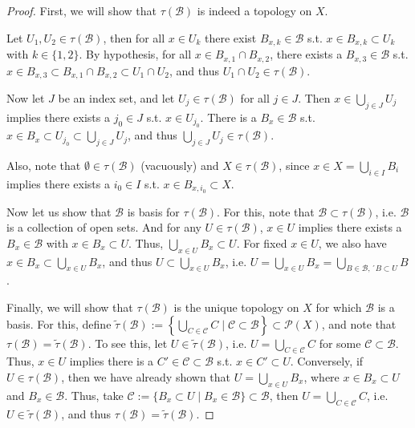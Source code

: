 \begin{proof}
	First, we will show that $\tau(\mathscr B)$ is indeed a topology on $X$. 
	
	Let $U_1, U_2\in\tau(\mathscr B)$, then for all $x\in U_k$ there exist $B_{x, k}\in\mathscr B$ s.t. $x\in B_{x, k}\subset U_k$ with $k \in\{1, 2\}$. By hypothesis, for all $x\in B_{x, 1}\cap B_{x, 2}$, there exists a $B_{x, 3}\in\mathscr B$ s.t. $x\in B_{x, 3}\subset B_{x, 1}\cap B_{x, 2}\subset U_1\cap U_2$, and thus $U_1\cap U_2\in\tau(\mathscr B)$.
	
	Now let $J$ be an index set, and let $U_j\in \tau(\mathscr B)$ for all $j\in J$. Then $x\in \bigcup_{j\in J}U_j$ implies there exists a $j_0\in J$ s.t. $x\in U_{j_0}$. There is a $B_{x}\in\mathscr B$ s.t. $x\in B_x\subset U_{j_0} \subset \bigcup_{j\in J}U_j$, and thus $\bigcup_{j\in J}U_j\in \tau(\mathscr B)$.
	
	Also, note that $\emptyset\in\tau(\mathscr B)$ (vacuously) and $X\in \tau(\mathscr B)$, since $x\in X = \bigcup_{i\in I}B_i$ implies there exists a $i_0\in I$ s.t. $x\in B_{x, i_0}\subset X$.
	
	Now let us show that $\mathscr B$ is basis for $\tau(\mathscr B)$. For this, note that $\mathscr B\subset \tau(\mathscr B)$, i.e. $\mathscr B$ is a collection of open sets. And for any $U\in\tau(\mathscr B)$, $x\in U$ implies there exists a $B_{x}\in \mathscr B$ with $x\in B_x\subset U$. Thus, $\bigcup_{x\in U}B_x \subset U$. For fixed $x\in U$, we also have $x\in B_x\subset \bigcup_{x\in U}B_x$, and thus $U\subset \bigcup_{x\in U}B_x$, i.e. $U = \bigcup_{x\in U}B_x = \bigcup_{B\in\mathscr B, ´B\subset U}B$.
	
	Finally, we will show that $\tau(\mathscr B)$ is the unique topology on $X$ for which $\mathscr B$ is a basis. For this, define $\tilde{\tau}(\mathscr B) := \left\{ \bigcup_{C\in\mathscr C}C \mid \mathscr C\subset \mathscr B \right\}\subset \mathscr P(X)$, and note that $\tau(\mathscr B) = \tilde{\tau}(\mathscr B)$. To see this, let $U\in\tilde{\tau}(\mathscr B)$, i.e. $U = \bigcup_{C\in\mathscr C}C$ for some $\mathscr C\subset \mathscr B$. Thus, $x\in U$ implies there is a $C'\in\mathscr C\subset \mathscr B$ s.t. $x\in C'\subset U$. Conversely, if $U\in\tau(\mathscr B)$, then we have already shown that $U = \bigcup_{x\in U}B_x$, where $x\in B_x\subset U$ and $B_x\in\mathscr B$. Thus, take $\mathscr C := \{ B_x\subset U\mid B_x\in\mathscr B \} \subset \mathscr B$, then $U = \bigcup_{C\in\mathscr C}C$, i.e. $U\in\tilde{\tau}(\mathscr B)$, and thus $\tau(\mathscr B) = \tilde{\tau}(\mathscr B)$. 
	

\end{proof}
